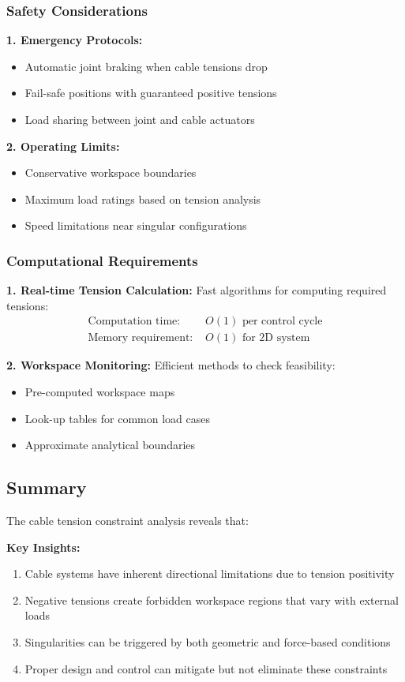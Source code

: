 \subsubsection{Safety Considerations}
\textbf{1. Emergency Protocols:}
\begin{itemize}
    \item Automatic joint braking when cable tensions drop
    \item Fail-safe positions with guaranteed positive tensions
    \item Load sharing between joint and cable actuators
\end{itemize}

\textbf{2. Operating Limits:}
\begin{itemize}
    \item Conservative workspace boundaries
    \item Maximum load ratings based on tension analysis
    \item Speed limitations near singular configurations
\end{itemize}

\subsubsection{Computational Requirements}
\textbf{1. Real-time Tension Calculation:}
Fast algorithms for computing required tensions:
\begin{align}
\text{Computation time: } &O(1) \text{ per control cycle} \\
\text{Memory requirement: } &O(1) \text{ for 2D system}
\end{align}

\textbf{2. Workspace Monitoring:}
Efficient methods to check feasibility:
\begin{itemize}
    \item Pre-computed workspace maps
    \item Look-up tables for common load cases
    \item Approximate analytical boundaries
\end{itemize}

\subsection{Summary}
The cable tension constraint analysis reveals that:

\textbf{Key Insights:}
\begin{enumerate}
    \item Cable systems have inherent directional limitations due to tension positivity
    \item Negative tensions create forbidden workspace regions that vary with external loads
    \item Singularities can be triggered by both geometric and force-based conditions
    \item Proper design and control can mitigate but not eliminate these constraints
\end{enumerate}

